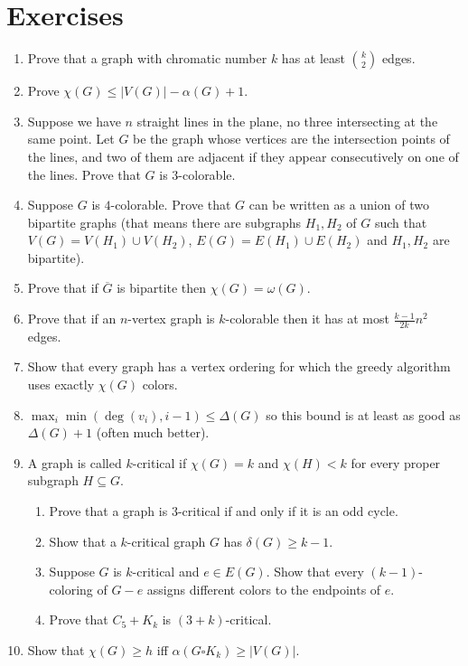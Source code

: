 \section{Exercises}

\begin{enumerate}
\item Prove that a graph with chromatic number $k$ has at least ${k\choose 2}$ edges.
\item Prove $\chi(G)\leq |V(G)|-\alpha(G)+1$.
\item Suppose we have $n$ straight lines in the plane, no three intersecting at the same point. Let $G$ be the graph whose vertices are the intersection points of the lines, and two of them are adjacent if they appear consecutively on one of the lines. Prove that $G$ is $3$-colorable.
\item Suppose $G$ is $4$-colorable. Prove that $G$ can be written as a union of two bipartite graphs (that means there are subgraphs $H_1,H_2$ of $G$ such that $V(G)=V(H_1)\cup V(H_2)$, $E(G)=E(H_1)\cup E(H_2)$ and $H_1,H_2$ are bipartite).
\item Prove that if $\overline{G}$ is bipartite then $\chi(G)=\omega(G)$.
\item Prove that if an $n$-vertex graph is $k$-colorable then it has at most $\frac{k-1}{2k}n^2$ edges.
\item Show that every graph has a vertex ordering for which the greedy algorithm uses exactly $\chi(G)$ colors.

\item $\max_i\min(\deg(v_i),i-1) \le \Delta(G)$ so this bound is at least as
good as $\Delta(G) + 1$ (often much better).

\item 
A graph is called $k$-critical if $\chi(G)=k$ and $\chi(H)<k$ for every proper subgraph $H\subseteq G$.

\begin{enumerate}
\item Prove that a graph is $3$-critical if and only if it is an odd cycle.
\item Show that a $k$-critical graph $G$ has $\delta(G)\geq k-1$.
\item Suppose $G$ is $k$-critical and $e\in E(G)$. Show that every $(k-1)$-coloring of $G-e$ assigns different colors to the endpoints of $e$.
\item Prove that $C_5+K_k$ is $(3+k)$-critical.
\end{enumerate}

\item Show that $\chi(G)\geq h$ iff $\alpha(G \square K_k) \geq |V(G)|$.
\end{enumerate}